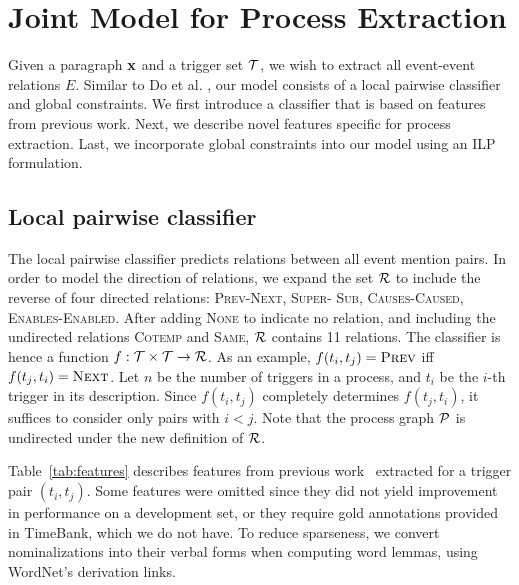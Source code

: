 \section{Joint Model for Process Extraction}

Given a paragraph $\mathbf{x}$ and a trigger set $\mathcal{T}$, we wish to extract all event-event relations $E$. Similar to Do et al. , our model consists of a local pairwise classifier and global constraints. We first introduce a classifier that is based on features from previous work. Next, we describe novel features specific for process extraction. Last, we incorporate global constraints into our model using an ILP formulation.

\subsection{Local pairwise classifier} \label{subsec:pairwise}

The local pairwise classifier predicts relations between all event mention pairs. In order to model the direction of relations, we expand the set $\mathcal{R}$ to include the reverse of four directed relations: \textsc{Prev}-\textsc{Next},  \textsc{Super}- \textsc{Sub}, \textsc{Causes}-\textsc{Caused}, \textsc{Enables}-\textsc{Enabled}. After adding \textsc{None} to indicate no relation, and including the undirected relations \textsc{Cotemp} and \textsc{Same}, $\mathcal{R}$ contains 11 relations. The classifier is hence a function $f:\mathcal{T} \times \mathcal{T} \rightarrow \mathcal{R}$. As an example, $f(t_i,t_j)=\mbox{\textsc{Prev}}$ iff $f(t_j,t_i)=\mbox{\textsc{Next}}$. Let $n$ be the number of triggers in a process, and $t_i$ be the $i$-th trigger in its description. Since $f(t_i,t_j)$ completely determines $f(t_j,t_i)$, it suffices to consider only pairs with $i<j$. Note that the process graph $\mathcal{P}$ is undirected under the new definition of $\mathcal{R}$.

Table~\ref{tab:features} describes features from previous work~\cite{Chambers08,Do12} extracted for a trigger pair $(t_i,t_j)$. Some features were omitted since they did not yield improvement in performance on a development set, or they require gold annotations provided in TimeBank, which we do not have. To reduce sparseness, we convert nominalizations into their verbal forms when computing word lemmas, using WordNet's \cite{Fellbaum1998} derivation links.

